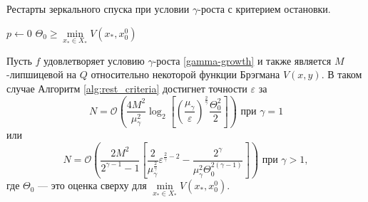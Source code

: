      \begin{algorithm}[htp]
        \caption{Рестарты зеркального спуска при условии $\gamma$-роста с критерием остановки.}
        \label{alg:rest_criteria}
        $p \gets 0$\;
        $\Theta_0 \geq \min\limits_{x_* \in X_*}{V(x_*,x_0^0)}$\;
    \end{algorithm}
    \begin{theorem}
        Пусть $f$ удовлетворяет условию $\gamma$-роста \eqref{gamma-growth} и также является $M$-липшицевой на $Q$ относительно некоторой функции Брэгмана $V(x, y)$. В таком случае Алгоритм \ref{alg:rest_criteria} достигнет точности $\varepsilon$ за
        \begin{equation}
           N = \mathcal{O} \left( \frac{4 M^2}{\mu_{\gamma}^2} \log_2{\left[\left(\frac{\mu_{\gamma}}{\varepsilon}\right)^{\frac{2}{\gamma}} \frac{\Theta_0^2}{2}\right]}\right) \text{ при } \gamma = 1
       \end{equation}
       или
       \begin{equation}
           N = \mathcal{O}\left( \frac{2 M^2 }{2^{\gamma - 1} - 1}\left[ \frac{2}{\mu_{\gamma}^{\frac{2}{\gamma}}}\varepsilon^{\frac{2}{\gamma} - 2} - \frac{2^{\gamma}}{\mu_{\gamma}^2 \Theta_0^{2(\gamma - 1)}} \right] \right) \text{ при } \gamma > 1,
       \end{equation}
       где $\Theta_0$ --- это оценка сверху для $\min\limits_{x_* \in X_*}{V(x_*, x_0^0)}$.
    \end{theorem}

